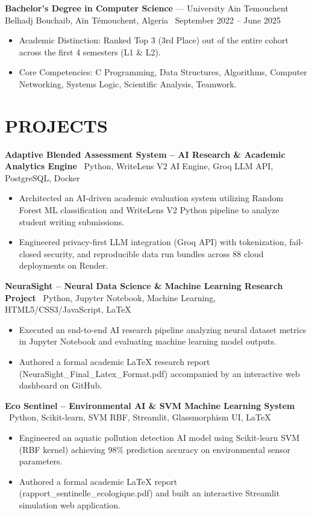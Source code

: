 \documentclass[10.5pt, letterpaper]{article}
\newcommand{\entry}[4]{%
  \noindent\textbf{#1} --- #3, #4 \textbar\ #2\par
  \vspace{2pt}
}
\newcommand{\projectentry}[2]{%
  \noindent\textbf{#1} \textbar\ #2\par
  \vspace{2pt}
}
\newcommand{\resumeItem}[1]{\item #1}
\begin{document}
\entry{Bachelor's Degree in Computer Science}{September 2022 -- June 2025}{University Ain Temouchent Belhadj Bouchaib}{Aïn Témouchent, Algeria}
\begin{itemize}
  \resumeItem{Academic Distinction: Ranked Top 3 (3rd Place) out of the entire cohort across the first 4 semesters (L1 \& L2).}
  \resumeItem{Core Competencies: C Programming, Data Structures, Algorithms, Computer Networking, Systems Logic, Scientific Analysis, Teamwork.}
\end{itemize}

\section{PROJECTS}

\projectentry{Adaptive Blended Assessment System -- AI Research \& Academic Analytics Engine}{Python, WriteLens V2 AI Engine, Groq LLM API, PostgreSQL, Docker}
\begin{itemize}
  \resumeItem{Architected an AI-driven academic evaluation system utilizing Random Forest ML classification and WriteLens V2 Python pipeline to analyze student writing submissions.}
  \resumeItem{Engineered privacy-first LLM integration (Groq API) with tokenization, fail-closed security, and reproducible data run bundles across 88 cloud deployments on Render.}
\end{itemize}

\projectentry{NeuraSight -- Neural Data Science \& Machine Learning Research Project}{Python, Jupyter Notebook, Machine Learning, HTML5/CSS3/JavaScript, LaTeX}
\begin{itemize}
  \resumeItem{Executed an end-to-end AI research pipeline analyzing neural dataset metrics in Jupyter Notebook and evaluating machine learning model outputs.}
  \resumeItem{Authored a formal academic LaTeX research report (NeuraSight\_Final\_Latex\_Format.pdf) accompanied by an interactive web dashboard on GitHub.}
\end{itemize}

\projectentry{Eco Sentinel -- Environmental AI \& SVM Machine Learning System}{Python, Scikit-learn, SVM RBF, Streamlit, Glassmorphism UI, LaTeX}
\begin{itemize}
  \resumeItem{Engineered an aquatic pollution detection AI model using Scikit-learn SVM (RBF kernel) achieving 98\% prediction accuracy on environmental sensor parameters.}
  \resumeItem{Authored a formal academic LaTeX report (rapport\_sentinelle\_ecologique.pdf) and built an interactive Streamlit simulation web application.}
\end{itemize}
\end{document}
